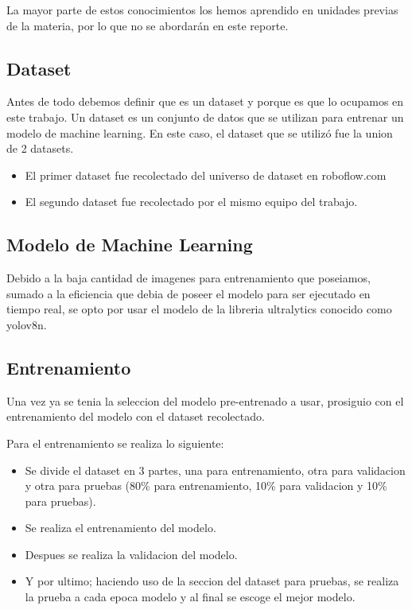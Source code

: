 \documentclass[conference]{IEEEtran}
\begin{document}
La mayor parte de estos conocimientos los hemos aprendido en unidades previas de la materia, por lo que no se abordarán en este reporte.

\subsection{Dataset}
Antes de todo debemos definir que es un dataset y porque es que lo ocupamos en este trabajo.
Un dataset es un conjunto de datos que se utilizan para entrenar un modelo de machine learning. En este caso, el dataset que se utilizó fue la union de 2 datasets.

\begin{itemize}
    \item El primer dataset fue recolectado del universo de dataset en roboflow.com\cite{}
    \item El segundo dataset fue recolectado por el mismo equipo del trabajo.
\end{itemize}

\subsection{Modelo de Machine Learning}
Debido a la baja cantidad de imagenes para entrenamiento que poseiamos, sumado a la eficiencia que debia de poseer el modelo para ser ejecutado en tiempo real, se opto por usar el modelo de la libreria ultralytics\cite{} conocido como yolov8n\cite{}.

\subsection{Entrenamiento}
Una vez ya se tenia la seleccion del modelo pre-entrenado a usar, prosiguio con el entrenamiento del modelo con el dataset recolectado.

Para el entrenamiento se realiza lo siguiente:
\begin{itemize}
    \item Se divide el dataset en 3 partes, una para entrenamiento, otra para validacion y otra para pruebas (80\% para entrenamiento, 10\% para validacion y 10\% para pruebas).
    \item Se realiza el entrenamiento del modelo.
    \item Despues se realiza la validacion del modelo.
    \item Y por ultimo; haciendo uso de la seccion del dataset para pruebas, se realiza la prueba a cada epoca modelo y al final se escoge el mejor modelo.
\end{itemize}
\end{document}
